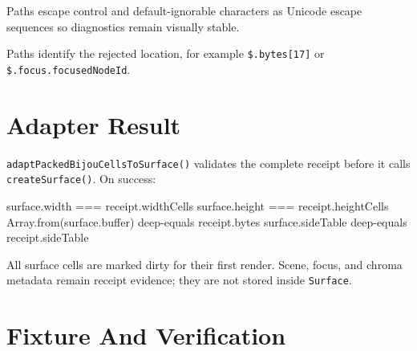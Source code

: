 Paths escape control and default-ignorable characters as Unicode escape sequences so diagnostics remain visually stable.



Paths identify the rejected location, for example \texttt{\$\allowbreak{}.\allowbreak{}b\allowbreak{}y\allowbreak{}t\allowbreak{}e\allowbreak{}s\allowbreak{}[\allowbreak{}1\allowbreak{}7\allowbreak{}]} or \texttt{\$\allowbreak{}.\allowbreak{}f\allowbreak{}o\allowbreak{}c\allowbreak{}u\allowbreak{}s\allowbreak{}.\allowbreak{}f\allowbreak{}o\allowbreak{}c\allowbreak{}u\allowbreak{}s\allowbreak{}e\allowbreak{}d\allowbreak{}N\allowbreak{}o\allowbreak{}d\allowbreak{}e\allowbreak{}I\allowbreak{}d}.

\section{Adapter Result}\label{record-022-adapter-result}

\texttt{a\allowbreak{}d\allowbreak{}a\allowbreak{}p\allowbreak{}t\allowbreak{}P\allowbreak{}a\allowbreak{}c\allowbreak{}k\allowbreak{}e\allowbreak{}d\allowbreak{}B\allowbreak{}i\allowbreak{}j\allowbreak{}o\allowbreak{}u\allowbreak{}C\allowbreak{}e\allowbreak{}l\allowbreak{}l\allowbreak{}s\allowbreak{}T\allowbreak{}o\allowbreak{}S\allowbreak{}u\allowbreak{}r\allowbreak{}f\allowbreak{}a\allowbreak{}c\allowbreak{}e\allowbreak{}(\allowbreak{})} validates the complete receipt before it calls \texttt{c\allowbreak{}r\allowbreak{}e\allowbreak{}a\allowbreak{}t\allowbreak{}e\allowbreak{}S\allowbreak{}u\allowbreak{}r\allowbreak{}f\allowbreak{}a\allowbreak{}c\allowbreak{}e\allowbreak{}(\allowbreak{})}. On success:

\begin{CodeBlock}
surface.width === receipt.widthCells
surface.height === receipt.heightCells
Array.from(surface.buffer) deep-equals receipt.bytes
surface.sideTable deep-equals receipt.sideTable
\end{CodeBlock}

All surface cells are marked dirty for their first render. Scene, focus, and chroma metadata remain receipt evidence; they are not stored inside \texttt{S\allowbreak{}u\allowbreak{}r\allowbreak{}f\allowbreak{}a\allowbreak{}c\allowbreak{}e}.

\section{Fixture And Verification}\label{record-022-fixture-and-verification}

